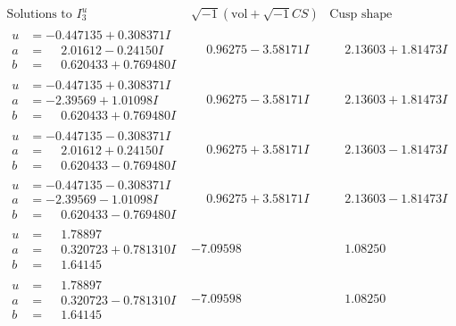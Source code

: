 \documentclass[1p]{elsarticle_modified}
\theoremstyle{definition}
\newcommand{\I}{\sqrt{-1}}
\begin{document}
$$\begin{array}{c|c|c}  
\text{Solutions to }I^u_{3}& \I (\text{vol} + \sqrt{-1}CS) & \text{Cusp shape}\\
 \hline 
\begin{aligned}
u &= -0.447135 + 0.308371 I \\
a &= \phantom{-}2.01612 - 0.24150 I \\
b &= \phantom{-}0.620433 + 0.769480 I\end{aligned}
 & \phantom{-}0.96275 - 3.58171 I & \phantom{-}2.13603 + 1.81473 I \\ \hline\begin{aligned}
u &= -0.447135 + 0.308371 I \\
a &= -2.39569 + 1.01098 I \\
b &= \phantom{-}0.620433 + 0.769480 I\end{aligned}
 & \phantom{-}0.96275 - 3.58171 I & \phantom{-}2.13603 + 1.81473 I \\ \hline\begin{aligned}
u &= -0.447135 - 0.308371 I \\
a &= \phantom{-}2.01612 + 0.24150 I \\
b &= \phantom{-}0.620433 - 0.769480 I\end{aligned}
 & \phantom{-}0.96275 + 3.58171 I & \phantom{-}2.13603 - 1.81473 I \\ \hline\begin{aligned}
u &= -0.447135 - 0.308371 I \\
a &= -2.39569 - 1.01098 I \\
b &= \phantom{-}0.620433 - 0.769480 I\end{aligned}
 & \phantom{-}0.96275 + 3.58171 I & \phantom{-}2.13603 - 1.81473 I \\ \hline\begin{aligned}
u &= \phantom{-}1.78897\phantom{ +0.000000I} \\
a &= \phantom{-}0.320723 + 0.781310 I \\
b &= \phantom{-}1.64145\phantom{ +0.000000I}\end{aligned}
 & -7.09598\phantom{ +0.000000I} & \phantom{-}1.08250\phantom{ +0.000000I} \\ \hline\begin{aligned}
u &= \phantom{-}1.78897\phantom{ +0.000000I} \\
a &= \phantom{-}0.320723 - 0.781310 I \\
b &= \phantom{-}1.64145\phantom{ +0.000000I}\end{aligned}
 & -7.09598\phantom{ +0.000000I} & \phantom{-}1.08250\phantom{ +0.000000I} \\ \hline\begin{aligned}

\end{aligned}
\end{array}$$
\end{document}
